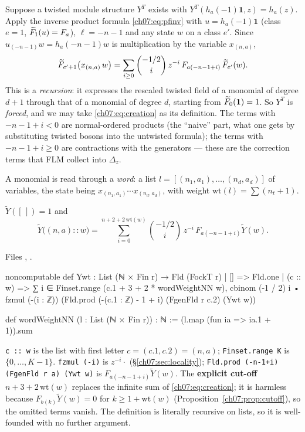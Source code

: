 Suppose a twisted module structure $Y^T$ exists with $Y^T(h_a(-1)\mathbf 1,z) = h_a(z)$. Apply
the inverse product formula \eqref{ch07:eq:pfinv} with $u = h_a(-1)\mathbf 1$ (class $e=1$,
$\widetilde{F}_1(u) = F_a$), $\ell = -n-1$ and any state $w$ on a class $e'$. Since
$u_{(-n-1)}w = h_a(-n-1)w$ is multiplication by the variable $x_{(n,a)}$,
\begin{equation}\label{ch07:eq:creation}
  \widetilde{F}_{e'+1}\bigl(x_{(n,a)}\,w\bigr) = \sum_{i\ge0}\binom{-1/2}{i}\,z^{-i}\,
  F_{a(-n-1+i)}\,\widetilde{F}_{e'}(w).
\end{equation}
This is a \emph{recursion}: it expresses the rescaled twisted field of a monomial of degree $d+1$
through that of a monomial of degree $d$, starting from $\widetilde{F}_0(\mathbf 1) = 1$. So $Y^T$ is
\emph{forced}, and we may take \eqref{ch07:eq:creation} as its definition. The terms with
$-n-1+i<0$ are normal-ordered products (the ``naive'' part, what one gets by substituting twisted
bosons into the untwisted formula); the terms with $-n-1+i\ge0$ are contractions with the
generators --- these are the correction terms that FLM collect into $\Delta_z$.

A monomial is read through a \emph{word}: a list $l = [(n_1,a_1),\dots,(n_d,a_d)]$ of variables,
the state being $x_{(n_1,a_1)}\cdots x_{(n_d,a_d)}$, with weight
$\mathrm{wt}(l) = \sum (n_t+1)$.

\begin{definition}\label{ch07:def:Ywt}
$\widetilde Y([\,]) = 1$ and
\begin{equation*}
  \widetilde Y\bigl((n,a)::w\bigr) = \sum_{i=0}^{n+2+2\,\mathrm{wt}(w)}\binom{-1/2}{i}\,z^{-i}\,
  F_{a(-n-1+i)}\widetilde Y(w).
\end{equation*}
\end{definition}

\noindent Files , .
\begin{leancode}
noncomputable def Ywt : List (ℕ × Fin r) → Fld (FockT r)
  | [] => Fld.one
  | (c :: w) => ∑ i ∈ Finset.range (c.1 + 3 + 2 * wordWeightNN w),
      cbinom (-1 / 2) i • fzmul (-(i : ℤ)) (Fld.prod (-(c.1 : ℤ) - 1 + i) (FgenFld r c.2) (Ywt w))

def wordWeightNN (l : List (ℕ × Fin r)) : ℕ := (l.map (fun ia => ia.1 + 1)).sum
\end{leancode}

\begin{dictionary}
\verb|c :: w| is the list with first letter $c = (c.1,c.2) = (n,a)$; \verb|Finset.range K| is
$\{0,\dots,K-1\}$. \verb|fzmul (-i)| is $z^{-i}\cdot$ (\S\ref{ch07:sec:locality});
\verb|Fld.prod (-n-1+i) (FgenFld r a) (Ywt w)| is $F_{a(-n-1+i)}\widetilde Y(w)$. The
\textbf{explicit cut-off} $n+3+2\,\mathrm{wt}(w)$ replaces the infinite sum of
\eqref{ch07:eq:creation}; it is harmless because $F_{b(k)}\widetilde Y(w) = 0$ for
$k\ge 1+\mathrm{wt}(w)$ (Proposition~\ref{ch07:prop:cutoff}), so the omitted terms vanish. The
definition is literally recursive on lists, so it is well-founded with no further argument.
\end{dictionary}

